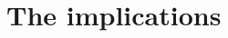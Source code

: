 \documentclass[11pt]{article}
\theoremstyle{remark}
\theoremstyle{definition}
\begin{document}
\section{The implications}









\end{document}
